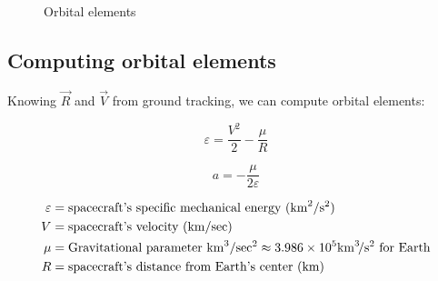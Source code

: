 \documentclass{article}
\newcommand{\myvarmukm}{\mu &= \text{Gravitational parameter \si{\kilo\meter\cubed\per\sec\squared}} \approx 3.986 \times 10^5 \si{\kilo\meter\cubed\per\second\squared} \text{ for Earth}}
\newcommand{\myvarv}{V &= \text{spacecraft's velocity (\si{\kilo\meter\per\sec})}}
\newcommand{\myvarepsilon}{\varepsilon &= \text{spacecraft's specific mechanical energy (\si{\kilo\meter\squared\per\second\squared)}}}
\begin{document}
\begin{figure}[!h]
	\centering
	\caption{Orbital elements}
	\label{fig:coordinate_system}
\end{figure}

\subsection{Computing orbital elements} \label{computing_orbital_elements}
Knowing $\vec{R}$ and $\vec{V}$ from ground tracking, we can compute orbital elements:

\begin{multicols}{3}
\begin{equation*}
\boxed{\varepsilon = \dfrac{V^2}{2} - \dfrac{\mu}{R}}
\end{equation*}

\begin{equation*}
\boxed{a = - \dfrac{\mu}{2 \varepsilon}}
\end{equation*}

\vfill\null
\columnbreak

\begin{align*}
\myvarepsilon\\
\myvarv\\
\myvarmukm \\
R &= \text{spacecraft's distance from Earth's center (\si{\kilo\meter})}\\
\end{align*}
\end{multicols}
\end{document}
